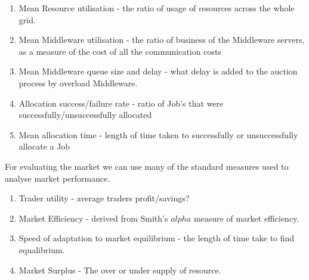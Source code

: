 \begin{enumerate}

  \item Mean Resource utilisation - the ratio of usage of resources across the
    whole grid.

  \item Mean Middleware utilisation - the ratio of business of
    the Middleware servers, as a measure of the cost of all the communication
    costs

  \item Mean Middleware queue size and delay - what delay is added to the
    auction process by overload Middleware.

  \item Allocation success/failure rate - ratio of Job's that were
    successfully/unsuccessfully allocated

  \item Mean allocation time - length of time taken to successfully or
    unsuccessfully allocate a Job


\end{enumerate}

For evaluating the market we can use many of the standard measures used to
analyse market performance.

\begin{enumerate}

  \item Trader utility - average traders profit/savings?

  \item Market Efficiency - derived from Smith's\cite{eco-smith62-competitive}
    $alpha$ measure of market efficiency. 

  \item Speed of adaptation to market equilibrium - the length of time take to
    find equalibrium.
  
  \item Market Surplus - The over or under supply of resource.

\end{enumerate}



